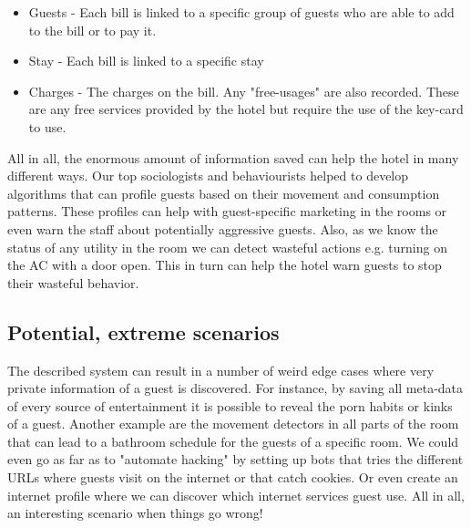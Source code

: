 \begin{itemize}
	\item Guests - Each bill is linked to a specific group of guests who are able to add to the bill or to pay it.
	\item Stay - Each bill is linked to a specific stay
	\item Charges - The charges on the bill. Any "free-usages" are also recorded. These are any free services provided by the hotel but require the use of the key-card to use.
\end{itemize}

All in all, the enormous amount of information saved can help the hotel in many different ways. Our top sociologists and behaviourists helped to develop algorithms that can profile guests based on their movement and consumption patterns. These profiles can help with guest-specific marketing in the rooms or even warn the staff about potentially aggressive guests. Also, as we know the status of any utility in the room we can detect wasteful actions e.g. turning on the AC with a door open. This in turn can help the hotel warn guests to stop their wasteful behavior.

\subsection{Potential, extreme scenarios}
The described system can result in a number of weird edge cases where very private information of a guest is discovered. For instance, by saving all meta-data of every source of entertainment it is possible to reveal the porn habits or kinks of a guest. Another example are the movement detectors in all parts of the room that can lead to a bathroom schedule for the guests of a specific room. We could even go as far as to "automate hacking" by setting up bots that tries the different URLs where guests visit on the internet or that catch cookies. Or even create an internet profile where we can discover which internet services guest use. All in all, an interesting scenario when things go wrong!

